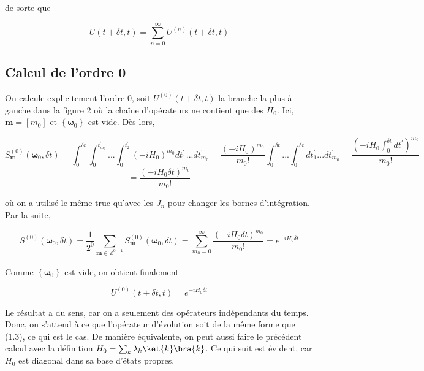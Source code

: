 de sorte que 

\begin{equation}
    U(t+\delta t, t) = \sum_{n=0}^{\infty}U^{(n)}(t+\delta t, t)
\end{equation}

\subsection{Calcul de l'ordre 0}
On calcule explicitement l'ordre 0, soit $U^{(0)}(t+\delta t, t)$ la branche la plus à gauche dans la figure 2 où la chaîne d'opérateurs ne contient que des $H_0$. Ici, $\boldsymbol{m} = [m_0]$ et $\left\{\boldsymbol{\omega}_0\right\}$ est vide. Dès lors,

\begin{equation*}
    S^{(0)}_{\boldsymbol{m}}(\boldsymbol{\omega}_0, \delta t) = \int_{0}^{\delta t}\int_{0}^{t_{m_0}^{'}}...\int_{0}^{t_2^{'}} (-iH_0)^{m_0}dt_1^{'}...dt_{m_0}^{'} = \frac{(-iH_0)^{m_0}}{m_0!}\int_{0}^{\delta t}...\int_{0}^{\delta t}dt_1^{'}...dt_{m_0}^{'} = \frac{(-iH_0\int_{0}^{\delta t}dt^{'})^{m_0}}{m_0!}
\end{equation*}
\begin{equation*}
    = \frac{(-iH_0\delta t)^{m_0}}{m_0!}
\end{equation*}

où on a utilisé le même truc qu'avec les $J_n$ pour changer les bornes d'intégration. Par la suite,

\begin{equation*}
    S^{(0)}(\boldsymbol{\omega}_0, \delta t) = \frac{1}{2^0}\sum_{\boldsymbol{m} \in \mathbb{Z}^{0+1}_{+}}S^{(0)}_{\boldsymbol{m}}(\boldsymbol{\omega}_0, \delta t) = \sum_{m_0=0}^{\infty}\frac{(-iH_0\delta t)^{m_0}}{m_0!} = e^{-iH_0\delta t}
\end{equation*}

Comme $\left\{\boldsymbol{\omega}_0\right\}$ est vide, on obtient finalement

\begin{equation*}
    U^{(0)}(t+\delta t, t) = e^{-iH_0\delta t}
\end{equation*}

Le résultat a du sens, car on a seulement des opérateurs indépendants du temps. Donc, on s'attend à ce que l'opérateur d'évolution soit de la même forme que (1.3), ce qui est le cas. De manière équivalente, on peut aussi faire le précédent calcul avec la définition $H_0 = \sum_{k}\lambda_k \ket{k}\bra{k}$. Ce qui suit est évident, car $H_0$ est diagonal dans sa base d'états propres.

